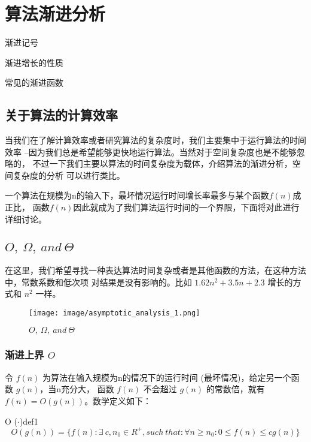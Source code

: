 \chapter{算法渐进分析}

\begin{introduction}
	\item 渐进记号
	\item 渐进增长的性质
	\item 常见的渐进函数
\end{introduction}

\section{关于算法的计算效率}
当我们在了解计算效率或者研究算法的复杂度时，我们主要集中于运行算法的时间效率
--因为我们总是希望能够更快地运行算法。当然对于空间复杂度也是不能够忽略的，
不过一下我们主要以算法的时间复杂度为载体，介绍算法的渐进分析，空间复杂度的分析
可以进行类比。

一个算法在规模为n的输入下，最坏情况运行时间增长率最多与某个函数$f(n)$成正比，
函数$f(n)$因此就成为了我们算法运行时间的一个界限，下面将对此进行详细讨论。

\section{\texorpdfstring{$O,\ \Omega,\ and\ \Theta $}{O, Ω, and θ}}
在这里，我们希望寻找一种表达算法时间复杂或者是其他函数的方法，在这种方法中，常数系数和低次项
对结果是没有影响的。比如 $1.62n^2+3.5n+2.3$ 增长的方式和 $n^2$ 一样。

\begin{figure}[h]
	\begin{minipage}[t]{1\linewidth}
		\centering
		\texttt{[image: image/asymptotic\_analysis\_1.png]}
		\caption{$O,\ \Omega,\ and\ \Theta $}
	\end{minipage}
\end{figure}

\subsection{渐进上界 $O$}
令 $f(n)$ 为算法在输入规模为n的情况下的运行时间 (最坏情况)，给定另一个函数 $g(n)$，当n充分大，
函数 $f(n)$ 不会超过 $g(n)$ 的常数倍，就有 $f(n)=O(g(n))$。数学定义如下：

\begin{definition}{O ($\cdot$)}{def1}
	\[
		O(g(n))= \{f(n): \exists\ c,n_0\in R^+,such\ that: \forall n\ge n_0:0\le f(n)\le cg(n)\}
	\]
\end{definition}


